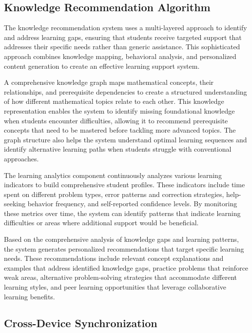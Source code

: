 \documentclass[conference]{IEEEtran}
\begin{document}
\subsection{Knowledge Recommendation Algorithm}

The knowledge recommendation system uses a multi-layered approach to identify and address learning gaps, ensuring that students receive targeted support that addresses their specific needs rather than generic assistance. This sophisticated approach combines knowledge mapping, behavioral analysis, and personalized content generation to create an effective learning support system.

A comprehensive knowledge graph maps mathematical concepts, their relationships, and prerequisite dependencies to create a structured understanding of how different mathematical topics relate to each other. This knowledge representation enables the system to identify missing foundational knowledge when students encounter difficulties, allowing it to recommend prerequisite concepts that need to be mastered before tackling more advanced topics. The graph structure also helps the system understand optimal learning sequences and identify alternative learning paths when students struggle with conventional approaches.

The learning analytics component continuously analyzes various learning indicators to build comprehensive student profiles. These indicators include time spent on different problem types, error patterns and correction strategies, help-seeking behavior frequency, and self-reported confidence levels. By monitoring these metrics over time, the system can identify patterns that indicate learning difficulties or areas where additional support would be beneficial.

Based on the comprehensive analysis of knowledge gaps and learning patterns, the system generates personalized recommendations that target specific learning needs. These recommendations include relevant concept explanations and examples that address identified knowledge gaps, practice problems that reinforce weak areas, alternative problem-solving strategies that accommodate different learning styles, and peer learning opportunities that leverage collaborative learning benefits.

\subsection{Cross-Device Synchronization}
\end{document}
